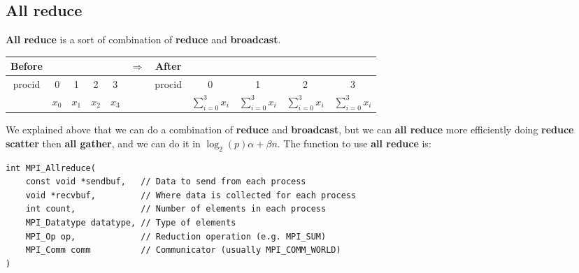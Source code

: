 \documentclass[12pt, openany]{report}
\theoremstyle{definition}
\begin{document}
\subsection{All reduce}
\textbf{All reduce} is a sort of combination of \textbf{reduce} and \textbf{broadcast}.\\
\begin{center}
	\begin{tabular}{ccccc|c|ccccc}
		Before &&&&& $\Longrightarrow$ &After&&&&\\
		\hline
		procid & 0 & 1 & 2 & 3 & & procid & 0 & 1 & 2 & 3\\
		\hline
		& $x_0$ & $x_1$ & $x_2$ & $x_3$ && & $\displaystyle \sum_{i=0}^{3} x_i$ & $\displaystyle \sum_{i=0}^{3} x_i$ & $\displaystyle \sum_{i=0}^{3} x_i$ & $\displaystyle \sum_{i=0}^{3} x_i$\\
		\hline
	\end{tabular}
\end{center}
We explained above that we can do a combination of \textbf{reduce} and \textbf{broadcast}, but we can \textbf{all reduce} more efficiently doing \textbf{reduce scatter} then \textbf{all gather}, and we can do it in $\log_2(p)\alpha + \beta n$. The function to use \textbf{all reduce} is:
\begin{lstlisting}[style=CppStyle]
int MPI_Allreduce(
    const void *sendbuf,   // Data to send from each process
    void *recvbuf,         // Where data is collected for each process 
    int count,             // Number of elements in each process
    MPI_Datatype datatype, // Type of elements
    MPI_Op op,             // Reduction operation (e.g. MPI_SUM)
    MPI_Comm comm          // Communicator (usually MPI_COMM_WORLD)
)
\end{lstlisting}
\end{document}
